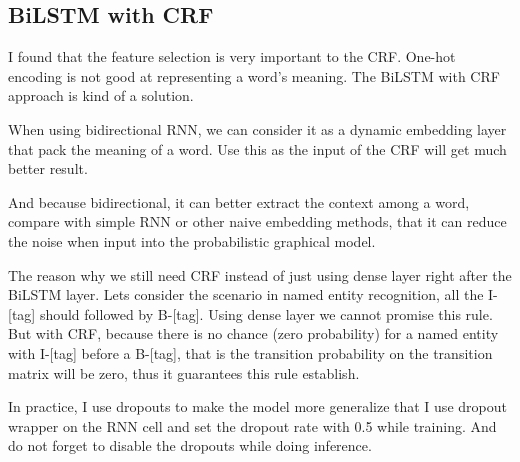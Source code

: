 \subsection{BiLSTM with CRF}
\label{sec:bilstm_crf}

I found that the feature selection is very important to the CRF. One-hot encoding is not good at representing a word's meaning. The BiLSTM with CRF~\cite{huang2015bidirectional} approach is kind of a solution.

When using bidirectional RNN, we can consider it as a dynamic embedding layer that pack the meaning of a word. Use this as the input of the CRF will get much better result.

And because bidirectional, it can better extract the context among a word, compare with simple RNN or other naive embedding methods, that it can reduce the noise when input into the probabilistic graphical model.

The reason why we still need CRF instead of just using dense layer right after the BiLSTM layer. Lets consider the scenario in named entity recognition, all the I-[tag] should followed by B-[tag]. Using dense layer we cannot promise this rule. But with CRF, because there is no chance (zero probability) for a named entity with I-[tag] before a B-[tag], that is the transition probability on the transition matrix will be zero, thus it guarantees this rule establish.

In practice, I use dropouts to make the model more generalize that I use dropout wrapper on the RNN cell and set the dropout rate with 0.5 while training. And do not forget to disable the dropouts while doing inference.
